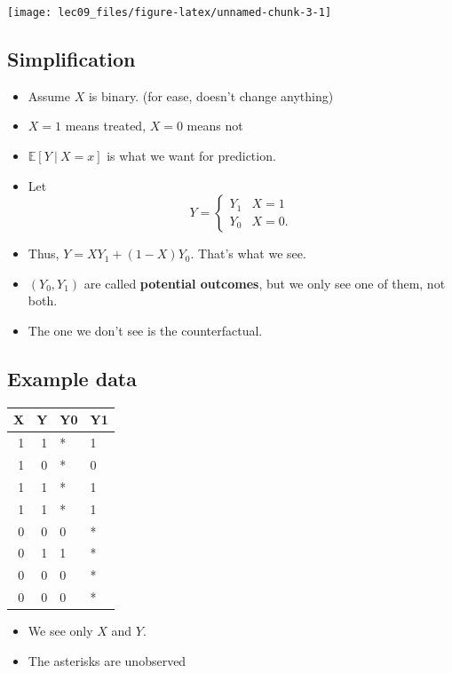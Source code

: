 \documentclass[]{article}
\providecommand{\tightlist}{%
  \setlength{\itemsep}{0pt}\setlength{\parskip}{0pt}}
\begin{document}
\begin{center}\texttt{[image: lec09\_files/figure-latex/unnamed-chunk-3-1]} \end{center}

\hypertarget{simplification}{%
\subsection{Simplification}\label{simplification}}

\begin{itemize}
\item
  Assume \(X\) is binary. (for ease, doesn't change anything)
\item
  \(X=1\) means treated, \(X=0\) means not
\item
  \(\mathbb{E}\left[ Y\ \vert\ X=x \right]\) is what we want for
  prediction.
\item
  Let \[ 
  Y = 
  \begin{cases}
  Y_1 & X = 1\\ Y_0 & X=0.
  \end{cases}
  \]
\item
  Thus, \(Y=XY_1+(1-X)Y_0\). That's what we see.
\item
  \((Y_0,Y_1)\) are called \textbf{potential outcomes}, but we only see
  one of them, not both.
\item
  The one we don't see is the counterfactual.
\end{itemize}

\hypertarget{example-data}{%
\subsection{Example data}\label{example-data}}

\begin{tabular}{r|r|l|l}
\hline
X & Y & Y0 & Y1\\
\hline
1 & 1 & * & 1\\
\hline
1 & 0 & * & 0\\
\hline
1 & 1 & * & 1\\
\hline
1 & 1 & * & 1\\
\hline
0 & 0 & 0 & *\\
\hline
0 & 1 & 1 & *\\
\hline
0 & 0 & 0 & *\\
\hline
0 & 0 & 0 & *\\
\hline
\end{tabular}

\begin{itemize}
\tightlist
\item
  We see only \(X\) and \(Y\).
\item
  The asterisks are unobserved
\end{itemize}
\end{document}
